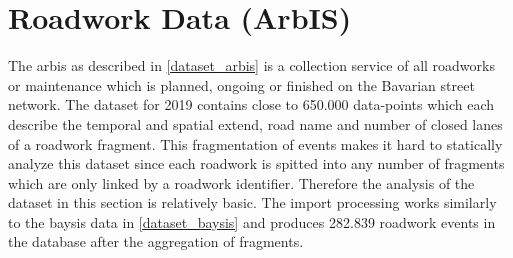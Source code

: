 \section{Roadwork Data (ArbIS)}
\label{dataset_arbis}

The \acrfull{arbis} as described in \autoref{dataset_arbis} is a collection service of all roadworks or maintenance which is planned, ongoing or finished on the Bavarian street network. The dataset for 2019 contains close to 650.000 data-points which each describe the temporal and spatial extend, road name and number of closed lanes of a roadwork fragment. This fragmentation of events makes it hard to statically analyze this dataset since each roadwork is spitted into any number of fragments which are only linked by a roadwork identifier. Therefore the analysis of the dataset in this section is relatively basic. The import processing works similarly to the \acrshort{baysis} data in \autoref{dataset_baysis} and produces 282.839 roadwork events in the database after the aggregation of fragments. 

